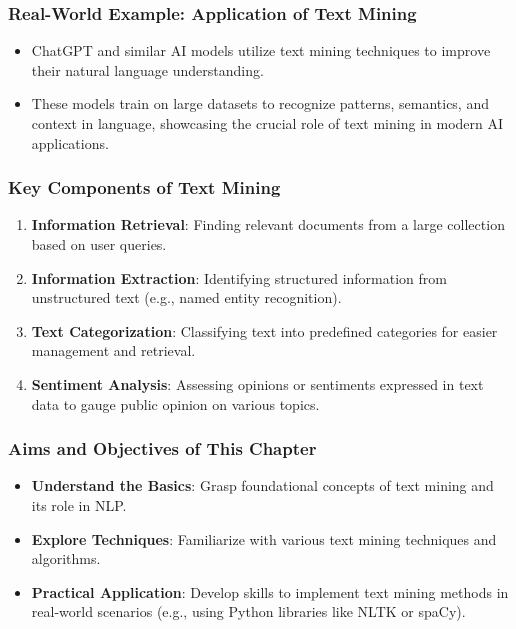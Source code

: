 \documentclass[aspectratio=169]{beamer}
\begin{document}
\begin{frame}[fragile]
    \frametitle{Real-World Example: Application of Text Mining}

    \begin{itemize}
        \item ChatGPT and similar AI models utilize text mining techniques to improve their natural language understanding.
        \item These models train on large datasets to recognize patterns, semantics, and context in language, showcasing the crucial role of text mining in modern AI applications.
    \end{itemize}
\end{frame}

\begin{frame}[fragile]
    \frametitle{Key Components of Text Mining}

    \begin{enumerate}
        \item \textbf{Information Retrieval}: Finding relevant documents from a large collection based on user queries.
        \item \textbf{Information Extraction}: Identifying structured information from unstructured text (e.g., named entity recognition).
        \item \textbf{Text Categorization}: Classifying text into predefined categories for easier management and retrieval.
        \item \textbf{Sentiment Analysis}: Assessing opinions or sentiments expressed in text data to gauge public opinion on various topics.
    \end{enumerate}
\end{frame}

\begin{frame}[fragile]
    \frametitle{Aims and Objectives of This Chapter}

    \begin{itemize}
        \item \textbf{Understand the Basics}: Grasp foundational concepts of text mining and its role in NLP.
        \item \textbf{Explore Techniques}: Familiarize with various text mining techniques and algorithms.
        \item \textbf{Practical Application}: Develop skills to implement text mining methods in real-world scenarios (e.g., using Python libraries like NLTK or spaCy).
    \end{itemize}
\end{frame}
\end{document}
